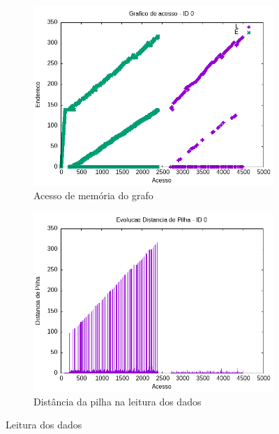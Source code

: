 \documentclass{article}
\begin{document}
\begin{figure}[H]
    \centering
    \hfill
    \begin{subfigure}[c]{0.4\textwidth}
        \centering
        \includegraphics[width=\textwidth]{./images/100-200/common/registro_a-acesso-0.png}
        \caption{Acesso de memória do grafo}
        \label{fig:ac01}
    \end{subfigure}%
    \hfill
    \begin{subfigure}[c]{0.4\linewidth}
        \centering
        \includegraphics[width=\textwidth]{./images/100-200/common/registro_a-distp-0.png}
        \caption{Distância da pilha na leitura dos dados}
        \label{fig:ac02}
    \end{subfigure}
    \hfill
    \caption{Leitura dos dados}
\end{figure}
\end{document}
